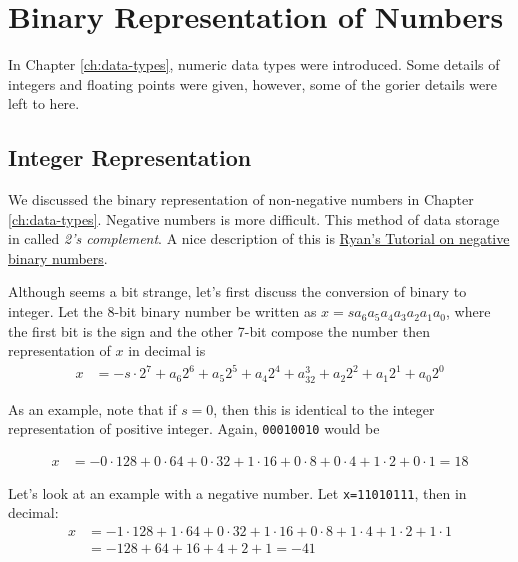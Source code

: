 
\chapter{Binary Representation of Numbers} \label{ch:num-rep}

In Chapter \ref{ch:data-types}, numeric data types were introduced.  Some details of integers and floating points were given, however, some of the gorier details were left to here. 

\section{Integer Representation}

We discussed the binary representation of non-negative numbers in Chapter \ref{ch:data-types}. Negative numbers is more difficult. This method of data storage in called \emph{2's complement}.  A nice description of this is \href{https://ryanstutorials.net/binary-tutorial/binary-negative-numbers.php}{Ryan's Tutorial on negative binary numbers}. 

Although seems a bit strange, let's first discuss the conversion of binary to integer.  Let the 8-bit binary number be written as $x=sa_6a_5a_4a_3a_2a_1a_0$, where the first bit is the sign and the other 7-bit compose the number then representation of $x$ in decimal is
\begin{align}
x & = -s \cdot 2^7 + a_6 2^6 + a_5 2^5 + a_4 2^4 + a_32^3 + a_2 2^2 + a_1 2^1 + a_0 2^0
\label{eq:8bit}
\end{align}

As an example, note that if $s=0$, then this is identical to the integer representation of positive integer.  Again, \verb!00010010! would be

\begin{align*}
x & = -0 \cdot 128 + 0 \cdot 64 + 0 \cdot 32 + 1 \cdot 16 + 0 \cdot 8 + 0 \cdot 4 + 1 \cdot 2 + 0 \cdot 1 = 18 
\end{align*}


Let's look at an example with a negative number.  Let \verb!x=11010111!, then in decimal:
\begin{align*}
x & = -1 \cdot 128 + 1 \cdot 64 + 0 \cdot 32 + 1 \cdot 16 + 0 \cdot 8 + 1 \cdot 4 + 1 \cdot 2 + 1 \cdot 1 \\
& = -128 + 64 + 16 + 4 +2 + 1 = -41
\end{align*}

